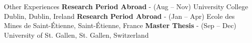 \begin{rubric}{Other Experiences}
\setPrefix{\faPlaneDeparture}
\entry*[2024] \textbf{Research Period Abroad} - (Aug -- Nov) University College Dublin, Dublin, Ireland
\entry*[2024] \textbf{Research Period Abroad} - (Jan -- Apr) Ecole des Mines de Saint-Étienne, Saint-Étienne, France
\entry*[2021] \textbf{Master Thesis} - (Sep -- Dec) University of St. Gallen, St. Gallen, Switzerland


\end{rubric}

